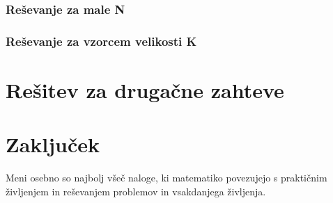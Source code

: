 \documentclass[a4paper, 12pt, titlepage]{article}
\begin{document}
\subsubsection{Reševanje za male N}
\subsubsection{Reševanje za vzorcem velikosti K}
\section{Rešitev za drugačne zahteve}

\section{Zaključek}

Meni osebno so najbolj všeč naloge, ki matematiko povezujejo s praktičnim življenjem in reševanjem problemov in vsakdanjega življenja.
\end{document}

